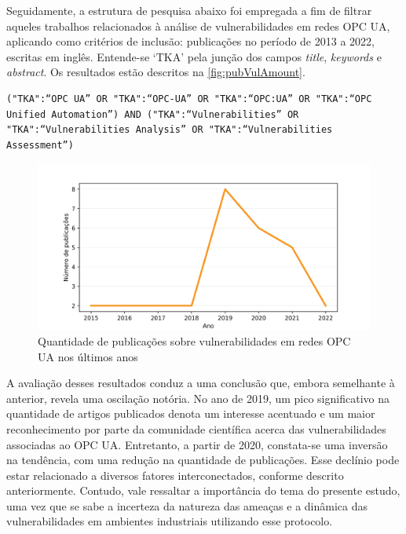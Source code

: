     Seguidamente, a estrutura de pesquisa abaixo foi empregada a fim de filtrar aqueles trabalhos relacionados à análise de vulnerabilidades em redes OPC UA, aplicando como critérios de inclusão: publicações no período de 2013 a 2022, escritas em inglês. Entende-se `TKA' pela junção dos campos \textit{title}, \textit{keywords} e \textit{abstract}. Os resultados estão descritos na \autoref{fig:pubVulAmount}.

    \begin{verbatim}
("TKA":“OPC UA” OR "TKA":“OPC-UA” OR "TKA":“OPC:UA” OR "TKA":“OPC Unified Automation”) AND ("TKA":“Vulnerabilities” OR "TKA":“Vulnerabilities Analysis” OR "TKA":“Vulnerabilities Assessment”)
    \end{verbatim}
    
    \begin{figure}[htbp]
        \caption{Quantidade de publicações sobre vulnerabilidades em redes OPC UA nos últimos anos}
        \label{fig:pubVulAmount}
        \begin{center}
            \includegraphics[width=0.7\linewidth]{USPSC-img/pubVulAmount.png}
        \end{center}
    \end{figure}
    
    A avaliação desses resultados conduz a uma conclusão que, embora semelhante à anterior, revela uma oscilação notória. No ano de 2019, um pico significativo na quantidade de artigos publicados denota um interesse acentuado e um maior reconhecimento por parte da comunidade científica acerca das vulnerabilidades associadas ao OPC UA. Entretanto, a partir de 2020, constata-se uma inversão na tendência, com uma redução na quantidade de publicações. Esse declínio pode estar relacionado a diversos fatores interconectados, conforme descrito anteriormente. Contudo, vale ressaltar a importância do tema do presente estudo, uma vez que se sabe a incerteza da natureza das ameaças e a dinâmica das vulnerabilidades em ambientes industriais utilizando esse protocolo.
    
